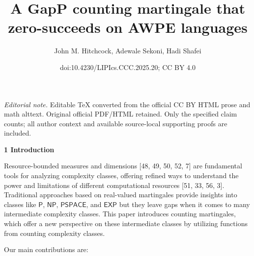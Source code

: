 \documentclass[10pt,a4paper]{article}
\title{A GapP counting martingale that zero-succeeds on AWPE languages}
\author{John M. Hitchcock, Adewale Sekoni, Hadi Shafei}
\date{doi:10.4230/LIPIcs.CCC.2025.20; CC BY 4.0}
\begin{document}
\maketitle
\noindent\textit{Editorial note.} Editable TeX converted from the official CC BY HTML prose and math alttext. Original official PDF/HTML retained. Only the specified claim counts; all author context and available source-local supporting proofs are included.\par\medskip


\par\medskip\noindent\textbf{
1 Introduction}\par




Resource-bounded measures and dimensions [48, 49, 50, 52, 7] are fundamental tools for analyzing complexity classes, offering refined ways to understand the power and limitations of different computational resources [51, 33, 56, 3].
Traditional approaches based on real-valued martingales provide insights into classes like $\mathsf{P}$, $\mathsf{NP}$, $\mathsf{PSPACE}$, and $\mathsf{EXP}$ but they leave gaps when it comes to many intermediate complexity classes. This paper introduces counting martingales, which offer a new perspective on these intermediate classes by utilizing functions from counting complexity classes.\par




Our main contributions are:\par
\end{document}
